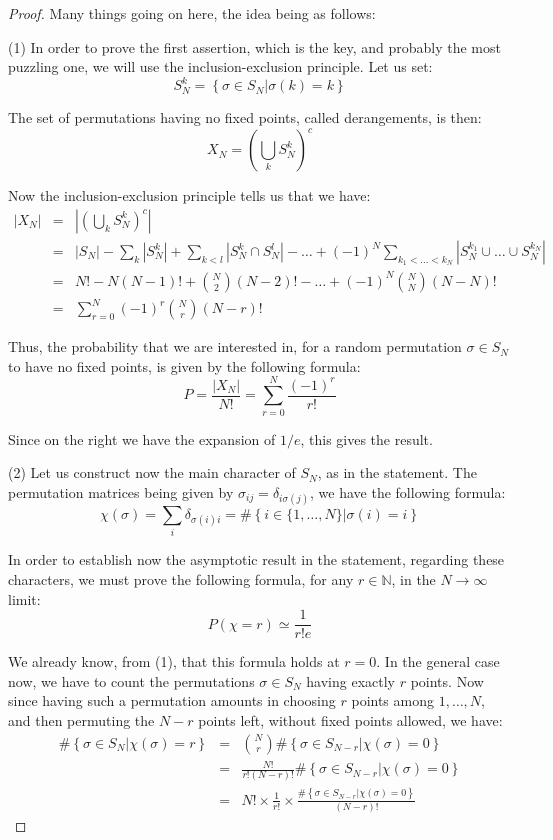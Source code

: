 \documentclass[12pt]{amsbook}
\begin{document}
\begin{proof}
Many things going on here, the idea being as follows:

\medskip

(1) In order to prove the first assertion, which is the key, and probably the most puzzling one, we will use the inclusion-exclusion principle. Let us set:
$$S_N^k=\left\{\sigma\in S_N\Big|\sigma(k)=k\right\}$$

The set of permutations having no fixed points, called derangements, is then:
$$X_N=\left(\bigcup_kS_N^k\right)^c$$

Now the inclusion-exclusion principle tells us that we have:
\begin{eqnarray*}
|X_N|
&=&\left|\left(\bigcup_kS_N^k\right)^c\right|\\
&=&|S_N|-\sum_k|S_N^k|+\sum_{k<l}|S_N^k\cap S_N^l|-\ldots+(-1)^N\sum_{k_1<\ldots<k_N}|S_N^{k_1}\cup\ldots\cup S_N^{k_N}|\\
&=&N!-N(N-1)!+\binom{N}{2}(N-2)!-\ldots+(-1)^N\binom{N}{N}(N-N)!\\
&=&\sum_{r=0}^N(-1)^r\binom{N}{r}(N-r)!
\end{eqnarray*}

Thus, the probability that we are interested in, for a random permutation $\sigma\in S_N$ to have no fixed points, is given by the following formula:
$$P
=\frac{|X_N|}{N!}
=\sum_{r=0}^N\frac{(-1)^r}{r!}$$

Since on the right we have the expansion of $1/e$, this gives the result.

\medskip

(2) Let us construct now the main character of $S_N$, as in the statement. The permutation matrices being given by $\sigma_{ij}=\delta_{i\sigma(j)}$, we have the following formula:
$$\chi(\sigma)
=\sum_i\delta_{\sigma(i)i}
=\#\left\{i\in\{1,\ldots,N\}\Big|\sigma(i)=i\right\}$$

In order to establish now the asymptotic result in the statement, regarding these characters, we must prove the following formula, for any $r\in\mathbb N$, in the $N\to\infty$ limit:
$$P(\chi=r)\simeq\frac{1}{r!e}$$

We already know, from (1), that this formula holds at $r=0$. In the general case now, we have to count the permutations $\sigma\in S_N$ having exactly $r$ points. Now since having such a permutation amounts in choosing $r$ points among $1,\ldots,N$, and then permuting the $N-r$ points left, without fixed points allowed, we have:
\begin{eqnarray*}
\#\left\{\sigma\in S_N\Big|\chi(\sigma)=r\right\}
&=&\binom{N}{r}\#\left\{\sigma\in S_{N-r}\Big|\chi(\sigma)=0\right\}\\
&=&\frac{N!}{r!(N-r)!}\#\left\{\sigma\in S_{N-r}\Big|\chi(\sigma)=0\right\}\\
&=&N!\times\frac{1}{r!}\times\frac{\#\left\{\sigma\in S_{N-r}\Big|\chi(\sigma)=0\right\}}{(N-r)!}
\end{eqnarray*}


\end{proof}
\end{document}
